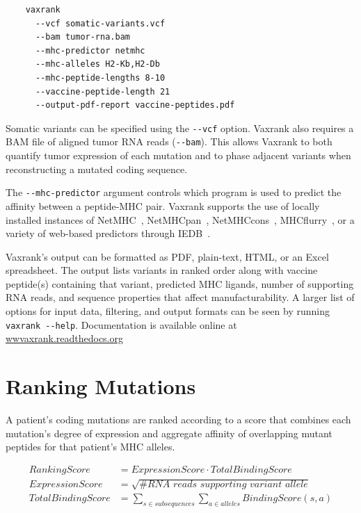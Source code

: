 \documentclass[10pt,letterpaper]{article}
\begin{document}
\vspace{1ex}
\begin{verbatim}
    vaxrank
      --vcf somatic-variants.vcf
      --bam tumor-rna.bam
      --mhc-predictor netmhc
      --mhc-alleles H2-Kb,H2-Db
      --mhc-peptide-lengths 8-10
      --vaccine-peptide-length 21
      --output-pdf-report vaccine-peptides.pdf
\end{verbatim}
\vspace{1ex}

Somatic variants can be specified using the \verb|--vcf| option. Vaxrank also requires a BAM file of aligned tumor RNA reads (\verb|--bam|). This allows Vaxrank to both quantify tumor expression of each mutation and to phase adjacent variants when reconstructing a mutated coding sequence.

The \verb|--mhc-predictor| argument controls which program is used to predict the affinity between a peptide-MHC pair. Vaxrank supports the use of locally installed instances of NetMHC~\citep{netmhc2016}, NetMHCpan~\citep{netmhcpan2007}, NetMHCcons~\citep{netmhccons}, MHCflurry~\citep{mhcflurry}, or a variety of web-based predictors through IEDB~\citep{iedb}. 

Vaxrank's output can be formatted as PDF, plain-text, HTML, or an Excel spreadsheet. The output lists variants in ranked order along with vaccine peptide(s) containing that variant, predicted MHC ligands, number of supporting RNA reads, and sequence properties that affect manufacturability. A larger list of options for input data, filtering, and output formats can be seen by running \verb|vaxrank --help|. Documentation is available online at \href{http://vaxrank.readthedocs.io}{wwvaxrank.readthedocs.org}

\section{Ranking Mutations}
A patient's coding mutations are ranked according to a score that combines each mutation's degree of expression and aggregate affinity of overlapping mutant peptides for that patient's MHC alleles.

\begin{align*}
\textit{RankingScore} 		&= \textit{ExpressionScore} \cdot \textit{TotalBindingScore} \\
\textit{ExpressionScore} 	&= \sqrt{\textit{\# RNA reads supporting variant allele}} \\
\textit{TotalBindingScore} 		&= \sum_{s \in \textit{subsequences}}\sum_{a \in \textit{alleles}}\textit{BindingScore}(s, a)
\end{align*}
\end{document}
